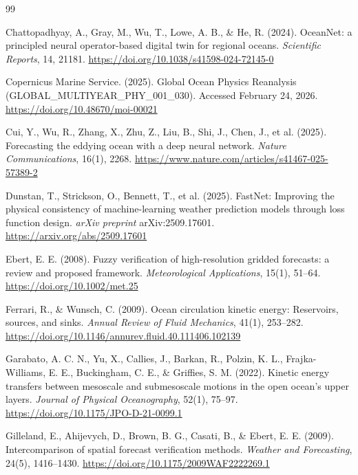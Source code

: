 \documentclass[11pt]{article}
\begin{document}
\begin{thebibliography}{99}

 Chattopadhyay, A., Gray, M., Wu, T., Lowe, A. B., \& He, R. (2024). OceanNet: a principled neural operator-based digital twin for regional oceans. \textit{Scientific Reports}, 14, 21181. \url{https://doi.org/10.1038/s41598-024-72145-0}

 Copernicus Marine Service. (2025). Global Ocean Physics Reanalysis (GLOBAL\_MULTIYEAR\_PHY\_001\_030). Accessed February 24, 2026. \url{https://doi.org/10.48670/moi-00021}

 Cui, Y., Wu, R., Zhang, X., Zhu, Z., Liu, B., Shi, J., Chen, J., et al. (2025). Forecasting the eddying ocean with a deep neural network. \textit{Nature Communications}, 16(1), 2268. \url{https://www.nature.com/articles/s41467-025-57389-2}

 Dunstan, T., Strickson, O., Bennett, T., et al. (2025). FastNet: Improving the physical consistency of machine-learning weather prediction models through loss function design. \textit{arXiv preprint} arXiv:2509.17601. \url{https://arxiv.org/abs/2509.17601}

 Ebert, E. E. (2008). Fuzzy verification of high-resolution gridded forecasts: a review and proposed framework. \textit{Meteorological Applications}, 15(1), 51--64. \url{https://doi.org/10.1002/met.25}

 Ferrari, R., \& Wunsch, C. (2009). Ocean circulation kinetic energy: Reservoirs, sources, and sinks. \textit{Annual Review of Fluid Mechanics}, 41(1), 253--282. \url{https://doi.org/10.1146/annurev.fluid.40.111406.102139}

 Garabato, A. C. N., Yu, X., Callies, J., Barkan, R., Polzin, K. L., Frajka-Williams, E. E., Buckingham, C. E., \& Griffies, S. M. (2022). Kinetic energy transfers between mesoscale and submesoscale motions in the open ocean's upper layers. \textit{Journal of Physical Oceanography}, 52(1), 75--97. \url{https://doi.org/10.1175/JPO-D-21-0099.1}

 Gilleland, E., Ahijevych, D., Brown, B. G., Casati, B., \& Ebert, E. E. (2009). Intercomparison of spatial forecast verification methods. \textit{Weather and Forecasting}, 24(5), 1416--1430. \url{https://doi.org/10.1175/2009WAF2222269.1}


\end{thebibliography}
\end{document}
